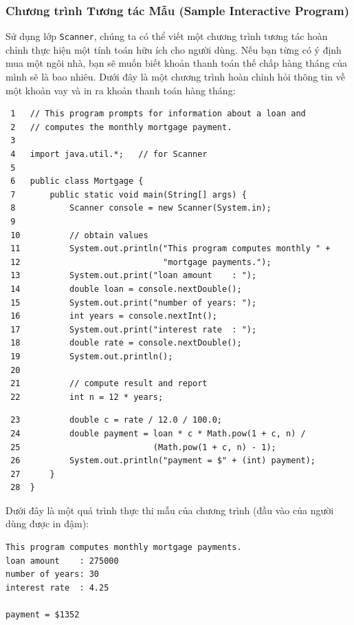 \subsubsection{Chương trình Tương tác Mẫu (Sample Interactive
Program)}\label{chux1b0ux1a1ng-truxecnh-tux1b0ux1a1ng-tuxe1c-mux1eabu-sample-interactive-program}

Sử dụng lớp \texttt{Scanner}, chúng ta có thể viết một chương trình
tương tác hoàn chỉnh thực hiện một tính toán hữu ích cho người dùng. Nếu
bạn từng có ý định mua một ngôi nhà, bạn sẽ muốn biết khoản thanh toán
thế chấp hàng tháng của mình sẽ là bao nhiêu. Dưới đây là một chương
trình hoàn chỉnh hỏi thông tin về một khoản vay và in ra khoản thanh
toán hàng tháng:

\begin{verbatim}
 1   // This program prompts for information about a loan and
 2   // computes the monthly mortgage payment.
 3
 4   import java.util.*;   // for Scanner
 5
 6   public class Mortgage {
 7       public static void main(String[] args) {
 8           Scanner console = new Scanner(System.in);
 9
 10          // obtain values
 11          System.out.println("This program computes monthly " +
 12                             "mortgage payments.");
 13          System.out.print("loan amount    : ");
 14          double loan = console.nextDouble();
 15          System.out.print("number of years: ");
 16          int years = console.nextInt();
 17          System.out.print("interest rate  : ");
 18          double rate = console.nextDouble();
 19          System.out.println();
 20
 21          // compute result and report
 22          int n = 12 * years;
\end{verbatim}

\begin{verbatim}
 23          double c = rate / 12.0 / 100.0;
 24          double payment = loan * c * Math.pow(1 + c, n) /
 25                           (Math.pow(1 + c, n) - 1);
 26          System.out.println("payment = $" + (int) payment);
 27      }
 28  }
\end{verbatim}

Dưới đây là một quá trình thực thi mẫu của chương trình (đầu vào của
người dùng được in đậm):

\begin{verbatim}
This program computes monthly mortgage payments. 
loan amount    : 275000
number of years: 30
interest rate  : 4.25
 
payment = $1352
\end{verbatim}

